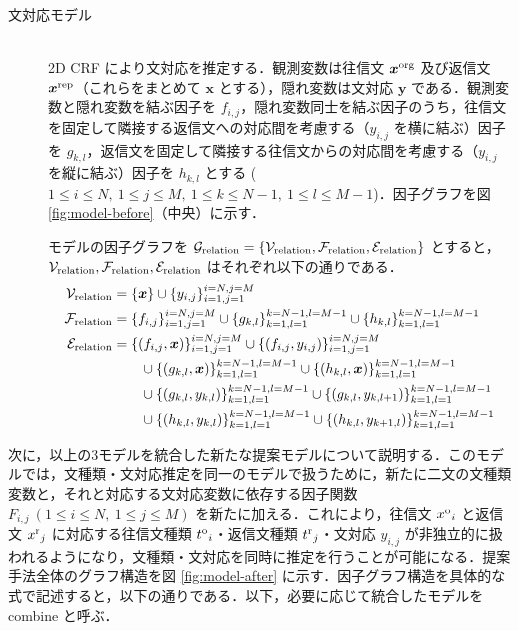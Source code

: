 \documentclass[japanese]{jnlp_1.4}
\begin{document}
\begin{description}
\item[文対応モデル] \mbox{} \\
  2D CRF により文対応を推定する．観測変数は往信文 $\bm{x}^{\rm org}$ 及び返信文 $\bm{x}^{\rm rep}$（これらをまとめて $\bm{x}$ とする），隠れ変数は文対応 $\bm{y}$ である．観測変数と隠れ変数を結ぶ因子を $f_{i,j}$，隠れ変数同士を結ぶ因子のうち，往信文を固定して隣接する返信文への対応間を考慮する（$y_{i,j}$ を横に結ぶ）因子を $g_{k,l}$，返信文を固定して隣接する往信文からの対応間を考慮する（$y_{i,j}$ を縦に結ぶ）因子を $h_{k,l}$ とする ($1 \leq i \leq N,~ 1 \leq j \leq M,~ 1 \leq k \leq N-1,~ 1 \leq l \leq M-1$)．因子グラフを図 \ref{fig:model-before}（中央）に示す．

モデルの因子グラフを $\mathcal{G}_{\rm relation} = \{ \mathcal{V}_{\rm relation}, \mathcal{F}_{\rm relation}, \mathcal{E}_{\rm relation} \}$ とすると，\\ $\mathcal{V}_{\rm relation}, \mathcal{F}_{\rm relation}, \mathcal{E}_{\rm relation}$ はそれぞれ以下の通りである．
\begin{equation}
\begin{split}
\mathcal{V}_{\rm relation} &= \{ \bm{x} \} \cup \{ {y}_{i,j} \}_{i=1,j=1}^{i=N,j=M} \\
\mathcal{F}_{\rm relation} &= \{ {f}_{i,j} \}_{i=1,j=1}^{i=N,j=M} \cup \{ {g}_{k,l} \}_{k=1,l=1}^{k=N-1,l=M-1} 
	\cup \{ {h}_{k,l} \}_{k=1,l=1}^{k=N-1,l=M-1} \\
\mathcal{E}_{\rm relation} &= \{ ({f}_{i,j}, \bm{x}) \}_{i=1,j=1}^{i=N,j=M} \cup \{ ({f}_{i,j}, y_{i,j}) \}_{i=1,j=1}^{i=N,j=M} \\
  & \qquad \cup \{ ({g}_{k,l}, \bm{x}) \}_{k=1,l=1}^{k=N-1,l=M-1} 
	\cup \{ ({h}_{k,l}, \bm{x}) \}_{k=1,l=1}^{k=N-1,l=M-1} \\
  & \qquad \cup \{ ({g}_{k,l}, {y}_{k,l}) \}_{k=1,l=1}^{k=N-1,l=M-1} \cup \{ ({g}_{k,l}, {y}_{k,l+1}) \}_{k=1,l=1}^{k=N-1,l=M-1} \\
  & \qquad \cup \{ ({h}_{k,l}, {y}_{k,l}) \}_{k=1,l=1}^{k=N-1,l=M-1} \cup \{ ({h}_{k,l}, {y}_{k+1,l}) \}_{k=1,l=1}^{k=N-1,l=M-1}
 \end{split}
\end{equation}
\end{description}

次に，以上の3モデルを統合した新たな提案モデルについて説明する．このモデルでは，文種類・文対応推定を同一のモデルで扱うために，新たに二文の文種類変数と，それと対応する文対応変数に依存する因子関数 $F_{i,j} ~ (1 \leq i \leq N,~ 1 \leq j \leq M)$ を新たに加える．これにより，往信文 ${x^{\rm o}}_{i}$ と返信文 ${x^{\rm r}}_{j}$ に対応する往信文種類 ${t^{\rm o}}_{i}$・返信文種類 ${t^{\rm r}}_{j}$・文対応 $y_{i,j}$ が非独立的に扱われるようになり，文種類・文対応を同時に推定を行うことが可能になる．提案手法全体のグラフ構造を図 \ref{fig:model-after} に示す．因子グラフ構造を具体的な式で記述すると，以下の通りである．以下，必要に応じて統合したモデルを combine と呼ぶ．
\vspace{1\Cvs}
\end{document}
